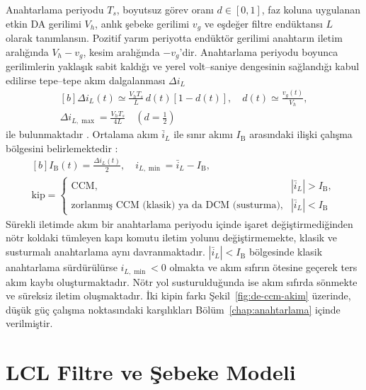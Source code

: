 Anahtarlama periyodu $T_s$, boyutsuz görev oranı $d\in[0,1]$, faz koluna uygulanan etkin DA gerilimi $V_h$, anlık şebeke gerilimi $v_g$ ve eşdeğer filtre endüktansı $L$ olarak tanımlansın. Pozitif yarım periyotta endüktör gerilimi anahtarın iletim aralığında $V_h-v_g$, kesim aralığında $-v_g$'dir. Anahtarlama periyodu boyunca gerilimlerin yaklaşık sabit kaldığı ve yerel volt--saniye dengesinin sağlandığı kabul edilirse tepe--tepe akım dalgalanması $\Delta i_L$
\begin{equation}
  \begin{gathered}[b]
    \Delta i_L(t)\simeq\frac{V_hT_s}{L}\,d(t)\left[1-d(t)\right],\quad
    d(t)\simeq\frac{v_g(t)}{V_h},\\
    \Delta i_{L,\max}=\frac{V_hT_s}{4L}
    \quad\left(d=\tfrac12\right)
  \end{gathered}
  \label{eq:buck-akim-dalgalanmasi}
\end{equation}
ile bulunmaktadır \citep{Erickson2001,Chen2010}. Ortalama akım $\bar i_L$ ile sınır akımı $I_{\mathrm{B}}$ arasındaki ilişki çalışma bölgesini belirlemektedir \citep{Mohan2003,Erickson2001,Holmes2003}:
\begin{equation}
  \begin{gathered}[b]
    I_{\mathrm{B}}(t)=\frac{\Delta i_L(t)}{2},\quad
    i_{L,\min}=\bar i_L-I_{\mathrm{B}},\\
    \text{kip}=
    \begin{cases}
      \text{CCM}, & |\bar i_L|>I_{\mathrm{B}},\\[5bp]
      \text{zorlanmış CCM (klasik) ya da DCM (susturma)}, & |\bar i_L|<I_{\mathrm{B}}
    \end{cases}
  \end{gathered}
  \label{eq:sinir-akimi}
\end{equation}
Sürekli iletimde akım bir anahtarlama periyodu içinde işaret değiştirmediğinden nötr koldaki tümleyen kapı komutu iletim yolunu değiştirmemekte, klasik ve susturmalı anahtarlama aynı davranmaktadır. $|\bar i_L|<I_{\mathrm{B}}$ bölgesinde klasik anahtarlama sürdürülürse $i_{L,\min}<0$ olmakta ve akım sıfırın ötesine geçerek ters akım kaybı oluşturmaktadır. Nötr yol susturulduğunda ise akım sıfırda sönmekte ve süreksiz iletim oluşmaktadır. İki kipin farkı Şekil~\ref{fig:de-ccm-akim} üzerinde, düşük güç çalışma noktasındaki karşılıkları Bölüm~\ref{chap:anahtarlama} içinde verilmiştir.

\section{LCL Filtre ve Şebeke Modeli}

